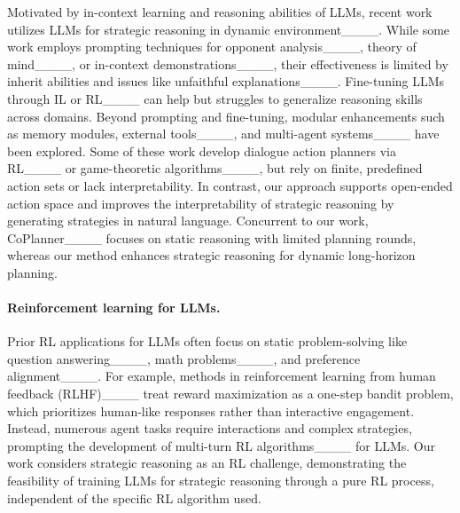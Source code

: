 Motivated by in-context learning and reasoning abilities of LLMs, recent work utilizes LLMs for strategic reasoning in dynamic environment____.
While some work employs prompting techniques for opponent analysis____, theory of mind____, or in-context demonstrations____, their effectiveness is limited by inherit abilities and issues like unfaithful explanations____. 
Fine-tuning LLMs through IL or RL____ can help but struggles to generalize reasoning skills across domains.
Beyond prompting and fine-tuning, modular enhancements such as memory modules, external tools____, and multi-agent systems____ have been explored. Some of these work develop dialogue action planners via RL____ or game-theoretic algorithms____, but rely on finite, predefined action sets or lack interpretability. 
In contrast, our approach supports open-ended action space and improves the interpretability of strategic reasoning by generating strategies in natural language. 
Concurrent to our work, CoPlanner____ focuses on static reasoning with limited planning rounds, whereas our method enhances strategic reasoning for dynamic long-horizon planning.

\paragraph{\textbf{Reinforcement learning for LLMs.}}
Prior RL applications for LLMs often focus on static problem-solving like question answering____, math problems____, and preference alignment____.
For example, methods in reinforcement learning from human feedback (RLHF)____ treat reward maximization as a one-step bandit problem, which prioritizes human-like responses rather than interactive engagement.
Instead, numerous agent tasks require interactions and complex strategies, prompting the development of multi-turn RL algorithms____ for LLMs. 
Our work considers strategic reasoning as an RL challenge, demonstrating the feasibility of training LLMs for strategic reasoning through a pure RL process, independent of the specific RL algorithm used.